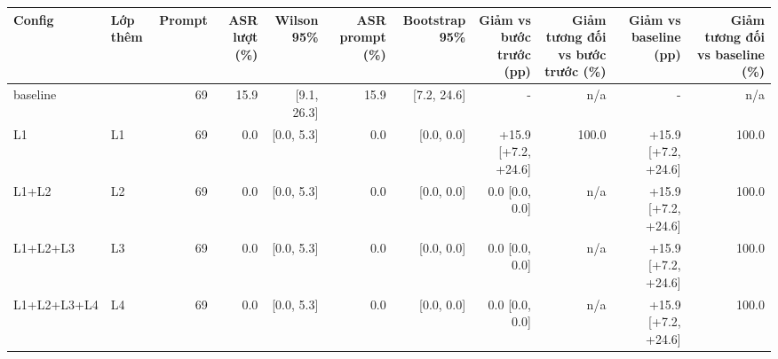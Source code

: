 \begin{tabular}{llrrrrrrrrr}
\toprule
Config & Lớp thêm & Prompt & ASR lượt (\%) & Wilson 95\% & ASR prompt (\%) & Bootstrap 95\% & Giảm vs bước trước (pp) & Giảm tương đối vs bước trước (\%) & Giảm vs baseline (pp) & Giảm tương đối vs baseline (\%) \\
\midrule
baseline &  & 69 & 15.9 & [9.1, 26.3] & 15.9 & [7.2, 24.6] & - & n/a & - & n/a \\
L1 & L1 & 69 & 0.0 & [0.0, 5.3] & 0.0 & [0.0, 0.0] & +15.9 [+7.2, +24.6] & 100.0 & +15.9 [+7.2, +24.6] & 100.0 \\
L1+L2 & L2 & 69 & 0.0 & [0.0, 5.3] & 0.0 & [0.0, 0.0] & 0.0 [0.0, 0.0] & n/a & +15.9 [+7.2, +24.6] & 100.0 \\
L1+L2+L3 & L3 & 69 & 0.0 & [0.0, 5.3] & 0.0 & [0.0, 0.0] & 0.0 [0.0, 0.0] & n/a & +15.9 [+7.2, +24.6] & 100.0 \\
L1+L2+L3+L4 & L4 & 69 & 0.0 & [0.0, 5.3] & 0.0 & [0.0, 0.0] & 0.0 [0.0, 0.0] & n/a & +15.9 [+7.2, +24.6] & 100.0 \\
\bottomrule
\end{tabular}
